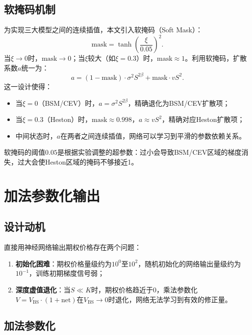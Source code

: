 \subsection{软掩码机制}

为实现三大模型之间的连续插值，本文引入软掩码（Soft Mask）：
\begin{equation}\label{eq:soft_mask}
  \text{mask} = \tanh\!\left(\frac{\xi}{0.05}\right)^2.
\end{equation}
当$\xi\to 0$时，$\text{mask}\to 0$；当$\xi$较大（如$\xi=0.3$）时，$\text{mask}\approx 1$。利用软掩码，扩散系数$a$统一为：
\begin{equation}\label{eq:soft_a}
  a = (1-\text{mask})\cdot\sigma^2 S^{2\beta} + \text{mask}\cdot v S^2.
\end{equation}
这一设计使得：
\begin{itemize}
  \item 当$\xi=0$（BSM/CEV）时，$a=\sigma^2 S^{2\beta}$，精确退化为BSM/CEV扩散项；
  \item 当$\xi=0.3$（Heston）时，$\text{mask}\approx 0.998$，$a\approx vS^2$，精确对应Heston扩散项；
  \item 中间状态时，$a$在两者之间连续插值，网络可以学习到平滑的参数依赖关系。
\end{itemize}

软掩码的阈值$0.05$是根据实验调整的超参数：过小会导致BSM/CEV区域的梯度消失，过大会使Heston区域的掩码不够接近1。

\section{加法参数化输出}\label{sec:additive_param}

\subsection{设计动机}

直接用神经网络输出期权价格存在两个问题：
\begin{enumerate}
  \item \textbf{初始化困难}：期权价格量级约为$10^0$至$10^2$，随机初始化的网络输出量级约为$10^{-1}$，训练初期梯度信号弱；
  \item \textbf{深度虚值退化}：当$S\ll K$时，期权价格趋近于0，乘法参数化$V=V_\text{BS}\cdot(1+\text{net})$在$V_\text{BS}\to 0$时退化，网络无法学习到有效的修正量。
\end{enumerate}

\subsection{加法参数化}

